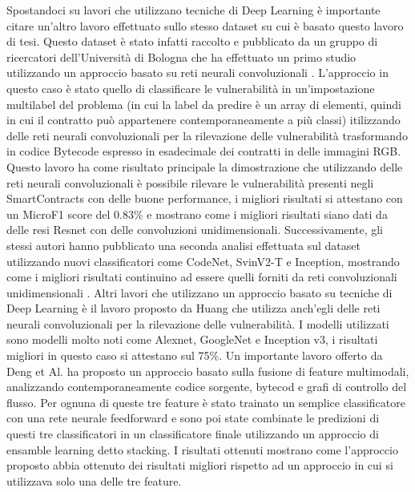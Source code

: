 \documentclass[../../Thesis.tex]{subfiles}
\begin{document}
Spostandoci su lavori che utilizzano tecniche di Deep Learning è importante citare un'altro lavoro effettuato sullo stesso dataset su cui è basato questo lavoro di tesi. Questo dataset è stato infatti raccolto e pubblicato da un gruppo di ricercatori dell'Università di Bologna che ha effettuato un primo studio utilizzando un approccio basato su reti neurali convoluzionali \cite{RossiniPaper1}. L'approccio in questo caso è stato quello di classificare le vulnerabilità in un'impostazione multilabel del problema (in cui la label da predire è un array di elementi, quindi in cui il contratto può appartenere contemporaneamente a più classi) itilizzando delle reti neurali convoluzionali per la rilevazione delle vulnerabilità trasformando in codice Bytecode espresso in esadecimale dei contratti in delle immagini RGB. Questo lavoro ha  come risultato principale la dimostrazione che utilizzando delle reti neurali convoluzionali è possibile rilevare le vulnerabilità presenti negli SmartContracts con delle buone performance, i migliori risultati si attestano con un MicroF1 score del 0.83\% e mostrano come i migliori risultati siano dati da delle resi Resnet con delle convoluzioni unidimensionali. Successivamente, gli stessi autori hanno pubblicato una seconda analisi effettuata sul dataset utilizzando nuovi classificatori come CodeNet, SvinV2-T e Inception, mostrando come i migliori risultati  continuino ad essere quelli forniti da reti convoluzionali unidimensionali \cite{RossiniPaper2}. Altri lavori che utilizzano un approccio basato su tecniche di Deep Learning è il lavoro proposto da Huang \cite{Huang} che utilizza anch'egli delle reti neurali convoluzionali per la rilevazione delle vulnerabilità. I modelli utilizzati sono modelli molto noti come Alexnet, GoogleNet e Inception v3, i risultati migliori in questo caso si attestano sul 75\%.
Un importante lavoro offerto da Deng et Al. \cite{Deng} ha proposto un approccio basato sulla fusione di feature multimodali, analizzando contemporaneamente codice sorgente, bytecod e grafi di controllo del flusso. Per ognuna di queste tre feature è stato trainato un semplice classificatore con una rete neurale feedforward e sono poi state combinate le predizioni di questi tre classificatori in un classificatore finale utilizzando un approccio di ensamble learning detto stacking. I risultati ottenuti mostrano come l'approccio proposto abbia ottenuto dei risultati migliori rispetto ad un approccio in cui si utilizzava solo una delle tre feature.
\end{document}
